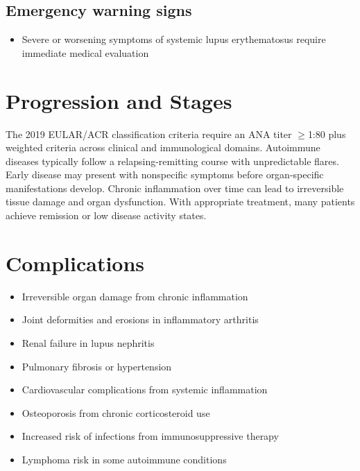 \subsection{Emergency warning signs}
\begin{itemize}[noitemsep]
  \item Severe or worsening symptoms of systemic lupus erythematosus require immediate medical evaluation
\end{itemize}
\section{Progression and Stages}
The 2019 EULAR/ACR classification criteria require an ANA titer $\geq$1:80 plus weighted criteria across clinical and immunological domains. Autoimmune diseases typically follow a relapsing-remitting course with unpredictable flares. Early disease may present with nonspecific symptoms before organ-specific manifestations develop. Chronic inflammation over time can lead to irreversible tissue damage and organ dysfunction. With appropriate treatment, many patients achieve remission or low disease activity states.
\section{Complications}
\begin{itemize}[noitemsep]
  \item Irreversible organ damage from chronic inflammation
  \item Joint deformities and erosions in inflammatory arthritis
  \item Renal failure in lupus nephritis
  \item Pulmonary fibrosis or hypertension
  \item Cardiovascular complications from systemic inflammation
  \item Osteoporosis from chronic corticosteroid use
  \item Increased risk of infections from immunosuppressive therapy
  \item Lymphoma risk in some autoimmune conditions
\end{itemize}
